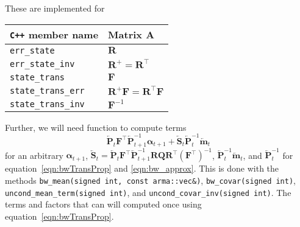 \documentclass[9pt, notitlepage]{article}
\renewcommand{\vec}[1]{\bm{#1}}
\newcommand{\vecLarrow}[1]{\overleftarrow{\vec{#1}}}
\newcommand{\mat}[1]{\mathbf{#1}}
\newcommand{\matLarrow}[1]{\overleftarrow{\mat{#1}}}
\newcommand{\Lparen}[1]{\left( #1\right)}
\begin{document}
These are implemented for %
%
\begin{center}
\begin{tabular}{ l l } 
 \verb|C++| member name & Matrix $\mat{A}$ \\
 \hline
 \verb|err_state|               & $\mat{R}$ \\
 \verb|err_state_inv|           & $\mat{R}^{+} = \mat{R}^\top$ \\
 \verb|state_trans|             & $\mat{F}$ \\
 \verb|state_trans_err|         & $\mat{R}^{+}\mat{F} = \mat{R}^\top\mat{F}$ \\
 \verb|state_trans_inv|         & $\mat{F}^{-1}$
\end{tabular}
\end{center}%
%
Further, we will need function to compute terms %
%
$$
	\matLarrow{P}_t\mat{F}^\top\matLarrow{P}_{t + 1}^{-1}\vec{\alpha}_{t+1}
		+ \matLarrow{S}_t\matLarrow{P}_t^{-1} \vecLarrow{m}_t
$$%
%
for an arbitrary $\vec{\alpha}_{t+1}$, %
$\matLarrow{S}_t = \matLarrow{P}_t\mat{F}^\top\matLarrow{P}_{t + 1}^{-1}\mat{R}\mat{Q}\mat{R}^\top\Lparen{\mat{F}^\top}^{-1}$, %
$\matLarrow{P}_t^{-1}\vecLarrow{m}_t$, and $\matLarrow{P}_t^{-1}$ for equation~\eqref{eqn:bwTransProp} and \eqref{eqn:bw_approx}. This is done with the methods 
\texttt{bw\_mean(signed int, const arma::vec\&)}, %
\texttt{bw\_covar(signed int)}, %
\texttt{uncond\_mean\_term(signed int)}, and \texttt{uncond\_covar\_inv(signed int)}. The terms and factors that can will computed once using equation~\eqref{eqn:bwTransProp}.
\end{document}
